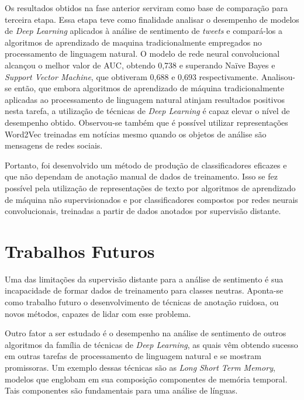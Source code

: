 Os resultados obtidos na fase anterior serviram como base de comparação para terceira etapa.
Essa etapa teve como finalidade analisar o desempenho de modelos de \textit{Deep Learning} aplicados à
análise de sentimento de \textit{tweets} e compará-los a algoritmos de aprendizado de maquina tradicionalmente empregados
no processamento de linguagem natural.
O modelo de rede neural convolucional alcançou o melhor valor de AUC, obtendo 0,738 e superando Naïve Bayes e
\textit{Support Vector Machine}, que obtiveram 0,688 e 0,693 respectivamente.
Analisou-se então, que embora algoritmos de aprendizado de máquina tradicionalmente aplicadas ao processamento de linguagem
natural atinjam resultados positivos nesta tarefa, a utilização de técnicas de \textit{Deep Learning} é capaz elevar o
nível de desempenho obtido.
Observou-se também que é possível utilizar representações Word2Vec treinadas em notícias mesmo quando os objetos de análise
são mensagens de redes sociais.

Portanto, foi desenvolvido um método de produção de classificadores eficazes e que não dependam de anotação manual de
dados de treinamento.
Isso se fez possível pela utilização de representações de texto por algoritmos de aprendizado de máquina não
supervisionados e por classificadores compostos por redes neurais convolucionais, treinadas a partir de dados anotados
por supervisão distante.

\section{Trabalhos Futuros}

Uma das limitações da supervisão distante para a análise de sentimento é sua incapacidade de formar dados de treinamento
para classes neutras.
Aponta-se como trabalho futuro o desenvolvimento de técnicas de anotação ruidosa, ou novos métodos, capazes de lidar
com esse problema.

Outro fator a ser estudado é o desempenho na análise de sentimento de outros algoritmos da família de técnicas de
\textit{Deep Learning}, as quais vêm obtendo sucesso em outras tarefas de processamento de linguagem natural e se mostram promissoras.
Um exemplo dessas técnicas são as \textit{Long Short Term Memory}, modelos que englobam em sua composição componentes
de memória temporal.
Tais componentes são fundamentais para uma análise de línguas.
